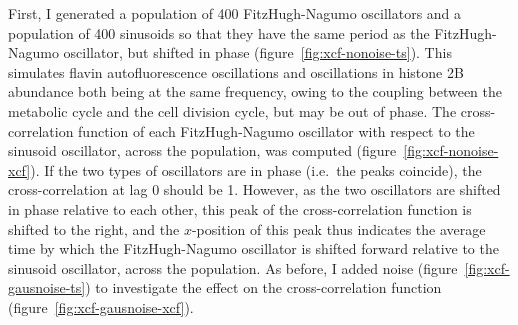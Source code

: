 First, I generated a population of 400 FitzHugh-Nagumo oscillators and a population of 400 sinusoids so that they have the same period as the FitzHugh-Nagumo oscillator, but shifted in phase (figure~\ref{fig:xcf-nonoise-ts}).
This simulates flavin autofluorescence oscillations and oscillations in histone 2B abundance both being at the same frequency, owing to the coupling between the metabolic cycle and the cell division cycle, but may be out of phase.
The cross-correlation function of each FitzHugh-Nagumo oscillator with respect to the sinusoid oscillator, across the population, was computed (figure~\ref{fig:xcf-nonoise-xcf}).
If the two types of oscillators are in phase (i.e.\ the peaks coincide), the cross-correlation at lag 0 should be 1.
However, as the two oscillators are shifted in phase relative to each other, this peak of the cross-correlation function is shifted to the right, and the $x$-position of this peak thus indicates the average time by which the FitzHugh-Nagumo oscillator is shifted forward relative to the sinusoid oscillator, across the population.
As before, I added noise (figure~\ref{fig:xcf-gausnoise-ts}) to investigate the effect on the cross-correlation function (figure~\ref{fig:xcf-gausnoise-xcf}).

